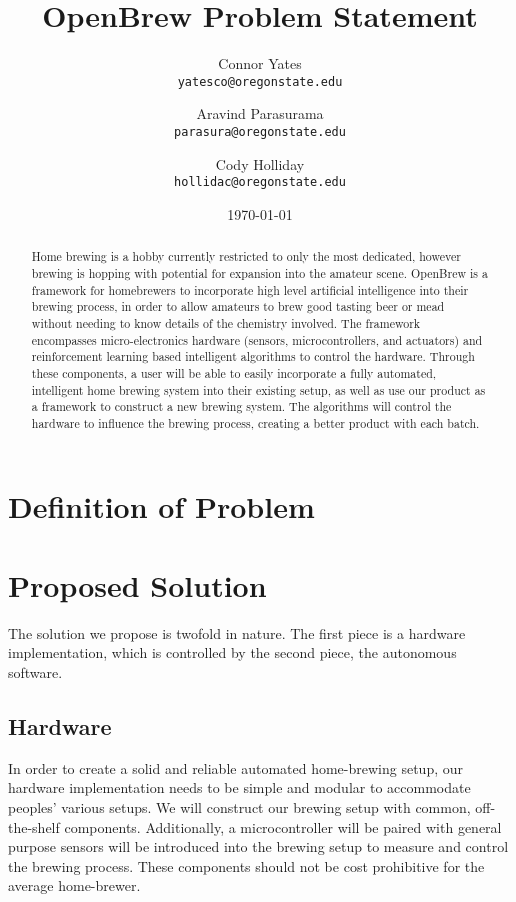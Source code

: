 \documentclass[letterpaper,10pt]{article}
\author{Connor Yates\\
\texttt{yatesco@oregonstate.edu}
\and
Aravind Parasurama\\
\texttt{parasura@oregonstate.edu}
\and
Cody Holliday\\
\texttt{hollidac@oregonstate.edu}}
\date{\today}
\title{OpenBrew Problem Statement}
\begin{document}
\maketitle

\begin{abstract}
Home brewing is a hobby currently restricted to only the most dedicated, however 
brewing is hopping with potential for expansion into the amateur scene. OpenBrew 
is a framework for homebrewers to incorporate high level artificial intelligence 
into their brewing process, in order to allow amateurs to brew good tasting beer 
or mead without needing to know details of the chemistry involved. The framework 
encompasses micro-electronics hardware (sensors, microcontrollers, and actuators) 
and reinforcement learning based intelligent algorithms to control the hardware. 
Through these components, a user will be able to easily incorporate a fully automated, 
intelligent home brewing system into their existing setup, as well as use our product 
as a framework to construct a new brewing system. The algorithms will control the 
hardware to influence the brewing process, creating a better product with each batch.
\end{abstract}

\newpage

\section{Definition of Problem}

\section{Proposed Solution}
The solution we propose is twofold in nature.
The first piece is a hardware implementation, which is controlled by the second piece, 
the autonomous software.

\subsection{Hardware}
In order to create a solid and reliable automated home-brewing setup, our hardware 
implementation needs to be simple and modular to accommodate peoples' various setups.
We will construct our brewing setup with common, off-the-shelf components.
Additionally, a microcontroller will be paired with general purpose sensors will be 
introduced into the brewing setup to measure and control the brewing process.
These components should not be cost prohibitive for the average home-brewer.
\end{document}
